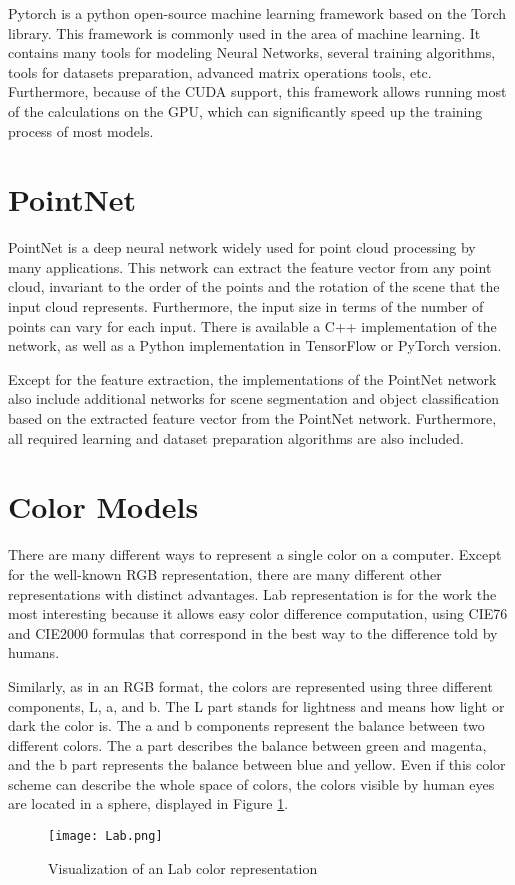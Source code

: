 Pytorch \cite{PyTorch} is a python open-source machine learning framework based on the Torch library. This framework is commonly used in the area of machine learning. It contains many tools for modeling Neural Networks, several training algorithms, tools for datasets preparation, advanced matrix operations tools, etc. Furthermore, because of the CUDA support, this framework allows running most of the calculations on the GPU, which can significantly speed up the training process of most models.

\section{PointNet}\label{section:pointNet}

PointNet \cite{PointNet} is a deep neural network widely used for point cloud processing by many applications. This network can extract the feature vector from any point cloud, invariant to the order of the points and the rotation of the scene that the input cloud represents. Furthermore, the input size in terms of the number of points can vary for each input. There is available a C++ implementation \cite{PNCpp} of the network, as well as a Python implementation in TensorFlow \cite{PNPython} or PyTorch \cite{PNTorch} version.\par
Except for the feature extraction, the implementations of the PointNet network also include additional networks for scene segmentation and object classification based on the extracted feature vector from the PointNet network. Furthermore, all required learning and dataset preparation algorithms are also included.

\section{Color Models}\label{section:colorModels}

There are many different ways to represent a single color on a computer. Except for the well-known RGB representation, there are many different other representations with distinct advantages. Lab \cite{Lab} representation is for the work the most interesting because it allows easy color difference computation, using CIE76 and CIE2000 formulas \cite{CIEs} that correspond in the best way to the difference told by humans.\par
Similarly, as in an RGB format, the colors are represented using three different components, L, a, and b. The L part stands for lightness and means how light or dark the color is. The a and b components represent the balance between two different colors. The a part describes the balance between green and magenta, and the b part represents the balance between blue and yellow. Even if this color scheme can describe the whole space of colors, the colors visible by human eyes are located in a sphere, displayed in Figure \ref{fig:labscheme}.

\begin{figure}[htpb]
    \centering
    \texttt{[image: Lab.png]}
    \caption{Visualization of an Lab color representation \cite{labImage}} \label{fig:labscheme}
\end{figure}
